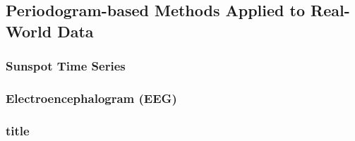 \documentclass[main.tex]{subfiles}
\begin{document}
\subsection{Periodogram-based Methods Applied to Real-World Data}




\subsubsection{Sunspot Time Series}


\subsubsection{Electroencephalogram (EEG)}










\subsubsection{title}


\clearpage
\end{document}
